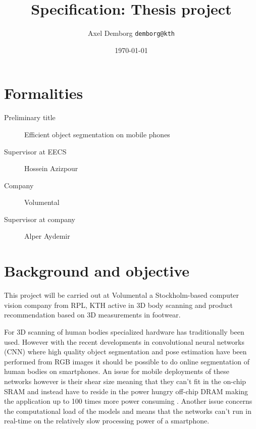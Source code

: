 \documentclass[11pt]{article}
\author{Axel Demborg \texttt{demborg@kth}}
\date{\today}
\title{Specification: Thesis project}
\newcommand{\bibentry}[1]{\cite{#1}}
\begin{document}
\maketitle

\section{Formalities}
\label{sec:org042d9b0}
\begin{description}
\item[{Preliminary title}] Efficient object segmentation on mobile phones
\item[{Supervisor at EECS}] Hossein Azizpour
\item[{Company}] Volumental
\item[{Supervisor at company}] Alper Aydemir
\end{description}

\section{Background and objective}
\label{sec:org2c7c144}
This project will be carried out at Volumental a Stockholm-based computer vision company from RPL, KTH active in 3D body scanning and product recommendation based on 3D measurements in footwear.

For 3D scanning of human bodies specialized hardware has traditionally been used. However with the recent developments in convolutional neural networks (CNN) where high quality object segmentation \bibentry{BriefHistory} and pose estimation \bibentry{he2017mask} have been performed from RGB images it should be possible to do online segmentation of human bodies on smartphones. An issue for mobile deployments of these networks however is their shear size meaning that they can't fit in the on-chip SRAM and instead have to reside in the power hungry off-chip DRAM making the application up to 100 times more power consuming \bibentry{han2015learning}. Another issue concerns the computational load of the models and means that the networks can't run in real-time on the relatively slow processing power of a smartphone.
\end{document}
